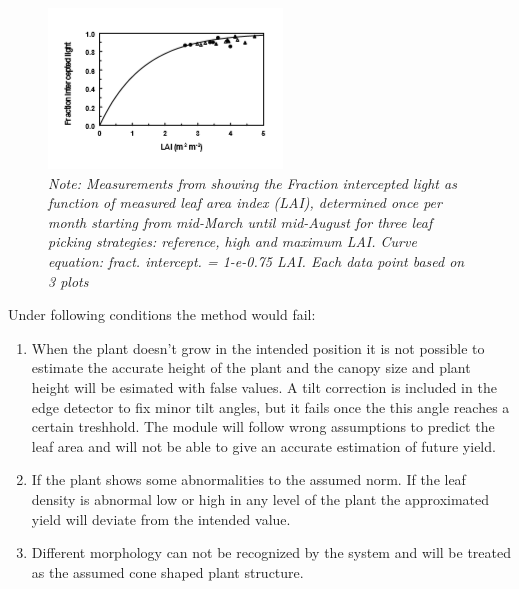 \begin{figure}[H]
    \centering
    \includegraphics[scale=1.2]{LAI.PNG}
    \caption{\textit{Note: Measurements from \cite{heuvelink2004effect} showing the Fraction intercepted light as function of measured leaf area index (LAI), determined once per month starting from mid-March until mid-August for three leaf picking strategies: reference, high and maximum LAI.  Curve equation: fract. intercept. = 1-e-0.75 LAI.  Each data point based on 3 plots}}
    \label{fig:LaiCurve}
\end{figure}

Under following conditions the method would fail:

\begin{enumerate}
    \item When the plant doesn't grow in the intended position it is not possible to estimate the accurate height of the plant and the canopy size and plant height will be esimated with false values. A tilt correction is included in the edge detector to fix minor tilt angles, but it fails once the this angle reaches a certain treshhold. The module will follow wrong assumptions to predict the leaf area and will not be able to give an accurate estimation of future yield.

    \item If the plant shows some abnormalities to the assumed norm. If the leaf density is abnormal low or high in any level of the plant the approximated yield will deviate from the intended value.

    \item Different morphology can not be recognized by the system and will be treated as the assumed cone shaped plant structure.
\end{enumerate}
